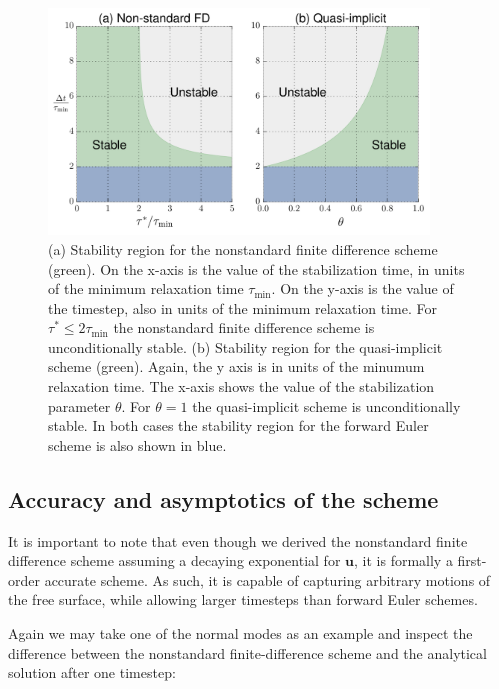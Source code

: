 \documentclass[preprint,12pt,authoryear]{elsarticle}
\begin{document}
\begin{figure}
\includegraphics[width=0.9\textwidth]{figures/stability_region.pdf}
\caption{(a) Stability region for the nonstandard finite difference scheme (green). On the x-axis is the value of the stabilization time, in units of the minimum relaxation time $\tau_{\mathrm{min}}$.  On the y-axis is the value of the timestep, also in units of the minimum relaxation time. For $\tau^*\le 2 \tau_{\mathrm{min}}$ the nonstandard finite difference scheme is unconditionally stable.  (b) Stability region for the quasi-implicit scheme (green).  Again, the y axis is in units of the minumum relaxation time.  The x-axis shows the value of the stabilization parameter $\theta$. For $\theta = 1$ the quasi-implicit scheme is unconditionally stable. In both cases the stability region for the forward Euler scheme is also shown in blue.}
\label{fig:stability_region}
\end{figure}

\subsection{Accuracy and asymptotics of the scheme}
It is important to note that even though we derived the nonstandard finite difference scheme assuming a decaying exponential
for $\mathbf{u}$, it is formally a first-order accurate scheme. As such, it is capable of capturing arbitrary motions 
of the free surface, while allowing larger timesteps than forward Euler schemes.

Again we may take one of the normal modes as an example and inspect the difference between the nonstandard finite-difference
scheme and the analytical solution after one timestep:
\end{document}
